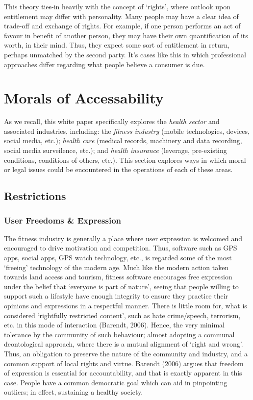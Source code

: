 \documentclass[11pt, english]{article}
\begin{document}
	This theory ties-in heavily with the concept of `rights', where outlook upon entitlement may differ with personality. Many people may have a clear idea of trade-off and exchange of rights. For example, if one person performs an act of favour in benefit of another person, they may have their own quantification of its worth, in their mind. Thus, they expect some sort of entitlement in return, perhaps unmatched by the second party. It's cases like this in which professional approaches differ regarding what people believe a consumer is due.

\newpage

\section{Morals of Accessability}

	As we recall, this white paper specifically explores the \textit{health sector} and associated industries, including: the \textit{fitness industry} (mobile technologies, devices, social media, etc.); \textit{health care} (medical records, machinery and data recording, social media surveilence, etc.); and \textit{health insurance} (leverage, pre-existing conditions, conditions of others, etc.). This section explores ways in which moral or legal issues could be encountered in the operations of each of these areas.

	\subsection{Restrictions}

		\subsubsection{User Freedoms \& Expression}

	The fitness industry is generally a place where user expression is welcomed and encouraged to drive motivation and competition. Thus, software such as GPS apps, social apps, GPS watch technology, etc., is regarded some of the most `freeing' technology of the modern age. Much like the modern action taken towards land access and tourism, fitness software encourages free expression under the belief that `everyone is part of nature', seeing that people willing to support such a lifestyle have enough integrity to ensure they practice their opinions and expressions in a respectful manner. There is little room for, what is considered `rightfully restricted content', such as hate crime/speech, terrorism, etc. in this mode of interaction (Barendt, 2006). Hence, the very minimal tolerance by the community of such behaviour; almost adopting a communal deontological approach, where there is a mutual alignment of `right and wrong'. Thus, an obligation to preserve the nature of the community and industry, and a common support of local rights and virtue. Barendt (2006) argues that freedom of expression is essential for accountability, and that is exactly apparent in this case. People have a common democratic goal which can aid in pinpointing outliers; in effect, sustaining a healthy society.\\
\end{document}

